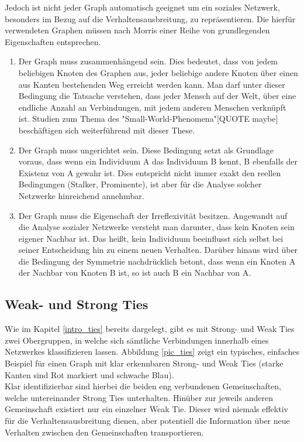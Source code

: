 \documentclass[12pt]{article}
\begin{document}
Jedoch ist nicht jeder Graph automatisch geeignet um ein soziales Netzwerk, besonders im Bezug auf die Verhaltensausbreitung, zu repräsentieren. Die hierfür verwendeten Graphen müssen nach Morris \cite{morris98} einer Reihe von grundlegenden Eigenschaften entsprechen.
\begin{enumerate}
\label{enum_graphConditions}
\item Der Graph muss zusammenhängend sein. Dies bedeutet, dass von jedem beliebigen Knoten des Graphen aus, jeder beliebige andere Knoten über einen aus Kanten bestehenden Weg erreicht werden kann. Man darf unter dieser Bedingung die Tatsache verstehen, dass jeder Mensch auf der Welt, über eine endliche Anzahl an Verbindungen, mit jedem anderen Menschen verknüpft ist. Studien zum Thema des "Small-World-Phenomena"[QUOTE maybe] beschäftigen sich weiterführend mit dieser These.
\item Der Graph muss ungerichtet sein. Diese Bedingung setzt als Grundlage voraus, dass wenn ein Individuum A das Individuum B kennt, B ebenfalls der Existenz von A gewahr ist. Dies entspricht nicht immer exakt den reellen Bedingungen (Stalker, Prominente), ist aber für die Analyse solcher Netzwerke hinreichend annehmbar.
\item Der Graph muss die Eigenschaft der Irreflexivität besitzen. Angewandt auf die Analyse sozialer Netzwerke versteht man darunter, dass kein Knoten sein eigener Nachbar ist. Das heißt, kein Individuum beeinflusst sich selbst bei seiner Entscheidung hin zu einem neuen Verhalten. Darüber hinaus wird über die Bedingung der Symmetrie nachdrücklich betont, dass wenn ein Knoten A der Nachbar von Knoten B ist, so ist auch B ein Nachbar von A.
\end{enumerate}


\subsection{Weak- und Strong Ties}
Wie im Kapitel \ref{intro_ties} bereits dargelegt, gibt es mit Strong- und Weak Ties zwei Obergruppen, in welche sich sämtliche Verbindungen innerhalb eines Netzwerkes klassifizieren lassen. Abbildung \ref{pic_ties} zeigt ein typisches, einfaches Beispiel für einen Graph mit klar erkennbaren Strong- und Weak Ties (starke Kanten sind Rot markiert und schwache Blau).\\
Klar identifizierbar sind hierbei die beiden eng verbundenen Gemeinschaften, welche untereinander Strong Ties unterhalten. Hinüber zur jeweils anderen Gemeinschaft existiert nur ein einzelner Weak Tie. Dieser wird niemals effektiv für die Verhaltensausbreitung dienen, aber potentiell die Information über neue Verhalten zwischen den Gemeinschaften transportieren.
\end{document}
